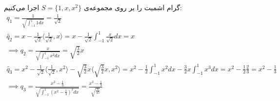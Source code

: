 \documentclass[]{article}
\begin{document}
{
	\thispagestyle{fancy}
	\fancyhf{}
	\fancyfoot{}
	\cfoot{\thepage}
	\renewcommand{\headrulewidth}{2pt}
	\KashidaOff
}
\noindent
گرام اشمیت را بر روی مجموعه‌ی
$S = \{1, x, x^2\}$
اجرا می‌کنیم:
\begin{gather*}
	q_1 = \frac{1}{\sqrt{\int_{-1}^1 1 dx}} = \frac{1}{\sqrt{2}}\\
	\widetilde{q_2} = x - \frac{1}{\sqrt{2}} \langle\frac{1}{\sqrt{2}}, x\rangle = x - \frac{1}{\sqrt{2}} \int_{-1}^{1} \frac{x}{\sqrt{2}} dx = x\\
	\implies q_2 = \frac{x}{\sqrt{\int_{-1}^1 x^2 dx}} = \sqrt{\frac{3}{2}}x\\
	\widetilde{q_3} = x^2 - \frac{1}{\sqrt{2}} \langle\frac{1}{\sqrt{2}}, x^2\rangle - \sqrt{\frac{3}{2}}x \langle\sqrt{\frac{3}{2}}x, x^2\rangle = 
	x^2 - \frac{1}{2} \int_{-1}^1 x^2 dx - \frac{3}{2}x \int_{-1}^1 x^3 dx = x^2 - \frac{1}{2} \frac{2}{3} = x^2 - \frac{1}{3}\\
	\implies q_3 = \frac{x^2 - \frac{1}{3}}{\sqrt{\int_{-1}^1 (x^2 - \frac{1}{3})^2 dx}} = \frac{x^2 - \frac{1}{3}}{\sqrt{\frac{8}{45}}}
\end{gather*}
\end{document}
